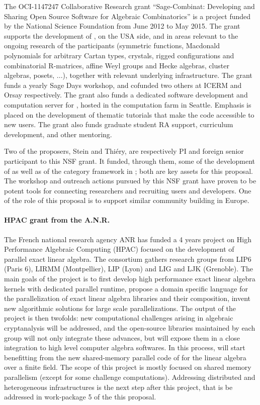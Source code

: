 The OCI-1147247 Collaborative Research grant ``Sage-Combinat:
Developing and Sharing Open Source Software for Algebraic
Combinatorics'' is a project funded by the National Science Foundation
from June 2012 to May 2015. The grant supports the development of
\SageCombinat, on the USA side, and in areas relevant to the ongoing
research of the participants (symmetric functions, Macdonald
polynomials for arbitrary Cartan types, crystals, rigged
configurations and combinatorial R-matrices, affine Weyl groups and
Hecke algebras, cluster algebras, posets, ...), together with relevant
underlying infrastructure. The grant funds a yearly Sage Days
workshop, and cofunded two others at ICERM and Orsay respectively. The
grant also funds a dedicated software development and computation
server for \SageCombinat, hosted in the \Sage computation farm in
Seattle. Emphasis is placed on the development of thematic tutorials
that make the code accessible to new users. The grant also funds
graduate student RA support, curriculum development, and other
mentoring.

Two of the proposers, Stein and Thiéry, are respectively PI and
foreign senior participant to this NSF grant. It funded, through them,
some of the development of \SMC as well as of the category framework
in \Sage; both are key assets for this proposal. The workshop and
outreach actions pursued by this NSF grant have proven to be potent
tools for connecting researchers and recruiting users and
developers. One of the role of this proposal is to support similar
community building in Europe.

\paragraph{HPAC grant from the A.N.R.}

The French national research agency ANR has funded a 4 years project
on High Performance Algebraic Computing (HPAC) focused on the
development of parallel exact linear algebra. The consortium gathers
research groups from LIP6 (Paris 6), LIRMM (Montpellier), LIP (Lyon)
and LIG and LJK (Grenoble). The main goals of the project is to first
develop high performance exact linear algebra kernels with dedicated
parallel runtime, propose a domain specific language for the
parallelization of exact linear algebra libraries and their
composition, invent new algorithmic solutions for large scale
parallelizations. The output of the project is then twofolds: new
computational challenges arising in algebraic cryptanalysis will be
addressed, and the open-source libraries maintained by each group will
not only integrate these advances, but will expose them in a close
integration to high level computer algebra softwares. In this process,
\Sage will start benefitting from the new shared-memory parallel code
of \Linbox for the linear algebra over a finite field.  The scope of
this project is mostly focused on shared memory parallelism (except
for some challenge computations). Addressing distributed and
heterogeneous infrastructures is the next step after this project,
that is be addressed in work-package 5 of the this proposal.


